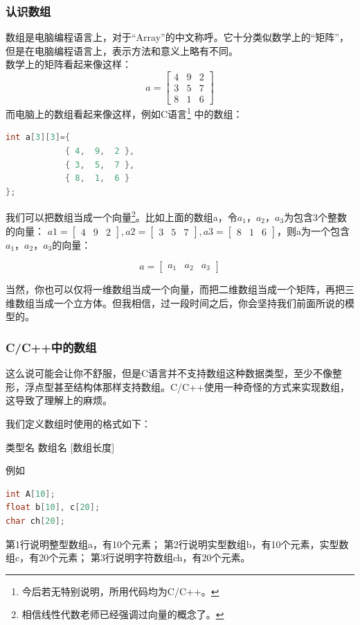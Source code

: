 \documentclass[a4paper]{article}
\begin{document}
\begin{CJK}{UTF8}{gbsn}
\subsubsection*{认识数组}
数组是电脑编程语言上，对于“Array”的中文称呼。它十分类似数学上的“矩阵”， 但是在电脑编程语言上，表示方法和意义上略有不同。\\
数学上的矩阵看起来像这样：
$$
a=
\begin{bmatrix}
4&9&2\\
3&5&7\\
8&1&6
\end{bmatrix}
$$
而电脑上的数组看起来像这样，例如C语言\footnote{今后若无特别说明，所用代码均为C/C++。} 中的数组：
\begin{lstlisting}[language=C]
int a[3][3]={ 
            { 4,  9,  2 },
            { 3,  5,  7 },
            { 8,  1,  6 }
};
\end{lstlisting}

我们可以把数组当成一个向量\footnote{相信线性代数老师已经强调过向量的概念了。}。比如上面的数组a，令$a_1$，$a_2$，$a_3$为包含3个整数的向量：
$a1=\begin{bmatrix}4&9&2\end{bmatrix}, a2=\begin{bmatrix}3&5&7\end{bmatrix}, a3=\begin{bmatrix}8&1&6\end{bmatrix}$，则a为一个包含$a_1$，$a_2$，$a_3$的向量：

$$
a=
\begin{bmatrix}
a_1&a_2&a_3
\end{bmatrix}
$$

当然，你也可以仅将一维数组当成一个向量，而把二维数组当成一个矩阵，再把三维数组当成一个立方体。但我相信，过一段时间之后，你会坚持我们前面所说的模型的。

\subsubsection*{C/C++中的数组}
这么说可能会让你不舒服，但是C语言并不支持数组这种数据类型，至少不像整形，浮点型甚至结构体那样支持数组。C/C++使用一种奇怪的方式来实现数组，这导致了理解上的麻烦。

我们定义数组时使用的格式如下：

\begin{center}
类型名 数组名 [数组长度]
\end{center}
例如
\begin{lstlisting}[language=C++]
int A[10];
float b[10], c[20];
char ch[20];
\end{lstlisting}
第1行说明整型数组a，有10个元素；
第2行说明实型数组b，有10个元素，实型数组c，有20个元素；
第3行说明字符数组ch，有20个元素。


\end{CJK}
\end{document}
